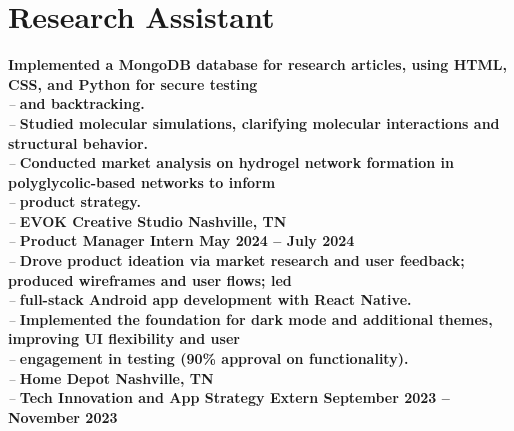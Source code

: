 \documentclass[letterpaper,11pt]{article}
\begin{document}
\section{Research Assistant}
\textbf{Implemented a MongoDB database for research articles, using HTML, CSS, and Python for secure testing} \hfill  \\
\textit{} \hfill \textit{ -- }
\vspace{2pt}\textbf{and backtracking.} \hfill  \\
\textit{} \hfill \textit{ -- }
\vspace{2pt}\textbf{Studied molecular simulations, clarifying molecular interactions and structural behavior.} \hfill  \\
\textit{} \hfill \textit{ -- }
\vspace{2pt}\textbf{Conducted market analysis on hydrogel network formation in polyglycolic-based networks to inform} \hfill  \\
\textit{} \hfill \textit{ -- }
\vspace{2pt}\textbf{product strategy.} \hfill  \\
\textit{} \hfill \textit{ -- }
\vspace{2pt}\textbf{EVOK Creative Studio Nashville, TN} \hfill  \\
\textit{} \hfill \textit{ -- }
\vspace{2pt}\textbf{Product Manager Intern May 2024 – July 2024} \hfill  \\
\textit{} \hfill \textit{ -- }
\vspace{2pt}\textbf{Drove product ideation via market research and user feedback; produced wireframes and user flows; led} \hfill  \\
\textit{} \hfill \textit{ -- }
\vspace{2pt}\textbf{full-stack Android app development with React Native.} \hfill  \\
\textit{} \hfill \textit{ -- }
\vspace{2pt}\textbf{Implemented the foundation for dark mode and additional themes, improving UI flexibility and user} \hfill  \\
\textit{} \hfill \textit{ -- }
\vspace{2pt}\textbf{engagement in testing (90\% approval on functionality).} \hfill  \\
\textit{} \hfill \textit{ -- }
\vspace{2pt}\textbf{Home Depot Nashville, TN} \hfill  \\
\textit{} \hfill \textit{ -- }
\vspace{2pt}\textbf{Tech Innovation and App Strategy Extern September 2023 – November 2023} \hfill  \\
\end{document}
